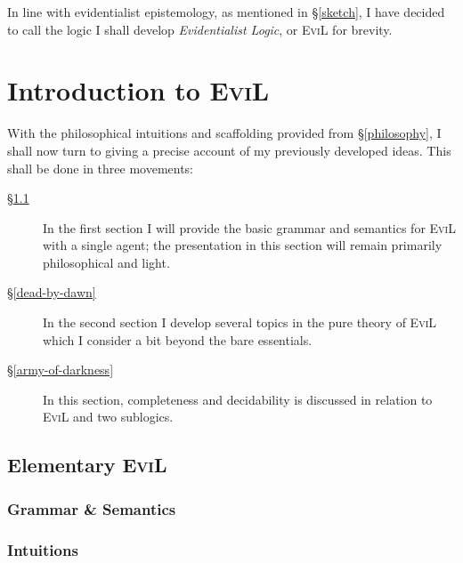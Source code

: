 \documentclass[11pt]{article}
\numberwithin{equation}{subsection}
\begin{document}
In line with evidentialist epistemology, as mentioned in
\S\ref{sketch}, I have decided to call the logic I shall develop
\emph{Evidentialist Logic}, or \textsc{EviL} for brevity.

\section{Introduction to \textsc{EviL}}\label{evil-semantics}
With the philosophical intuitions and scaffolding provided from
\S\ref{philosophy}, I shall now turn to giving a precise account of my previously
developed ideas.  This shall be done in three movements:
\begin{description}
 \item[\S\ref{basic-evil}]  In the first section I will provide the
   basic grammar and semantics for \textsc{EviL} with a single agent;
   the presentation in this section will remain primarily
   philosophical and light.
 \item[\S\ref{dead-by-dawn}]  In the second section I develop several
   topics in the pure theory of \textsc{EviL} which I consider a bit
   beyond the bare essentials.
  \item[\S\ref{army-of-darkness}]  In this section, completeness and
    decidability is discussed in relation to \textsc{EviL} and two sublogics.
\end{description}


\subsection{Elementary \textsc{EviL}}\label{basic-evil}
\subsubsection{Grammar \& Semantics}\label{evil-grammar}

\subsubsection{Intuitions}

\end{document}
